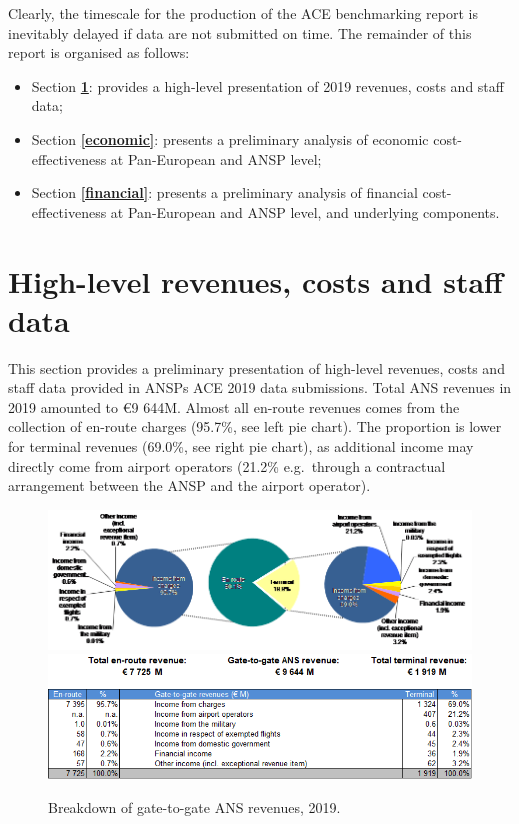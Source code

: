 \documentclass[
]{book}
\providecommand{\tightlist}{%
  \setlength{\itemsep}{0pt}\setlength{\parskip}{0pt}}
\begin{document}
Clearly, the timescale for the production of the ACE benchmarking report is inevitably delayed if data are not submitted on time.
The remainder of this report is organised as follows:

\begin{itemize}
\tightlist
\item
  Section \textbf{\ref{high}}: provides a high-level presentation of 2019 revenues, costs and staff data;
\item
  Section \textbf{\ref{economic}}: presents a preliminary analysis of economic cost-effectiveness at Pan-European and ANSP level;
\item
  Section \textbf{\ref{financial}}: presents a preliminary analysis of financial cost-effectiveness at Pan-European and ANSP level, and underlying components.
\end{itemize}

\hypertarget{high}{%
\chapter{High-level revenues, costs and staff data}\label{high}}

This section provides a preliminary presentation of high-level revenues, costs and staff data provided in ANSPs ACE 2019 data submissions. Total ANS revenues in 2019 amounted to €9 644M. Almost all en-route revenues comes from the collection of en-route charges (95.7\%, see left pie chart). The proportion is lower for terminal revenues (69.0\%, see right pie chart), as additional income may directly come from airport operators (21.2\% e.g.~through a contractual arrangement between the ANSP and the airport operator).



\begin{figure}

{\centering \includegraphics[width=0.5\linewidth]{figures/Figure 2-1-Top} \includegraphics[width=0.5\linewidth]{figures/Figure 2-1-Bottom} 

}

\caption{Breakdown of gate-to-gate ANS revenues, 2019.}\label{fig:figure4}
\end{figure}
\end{document}

